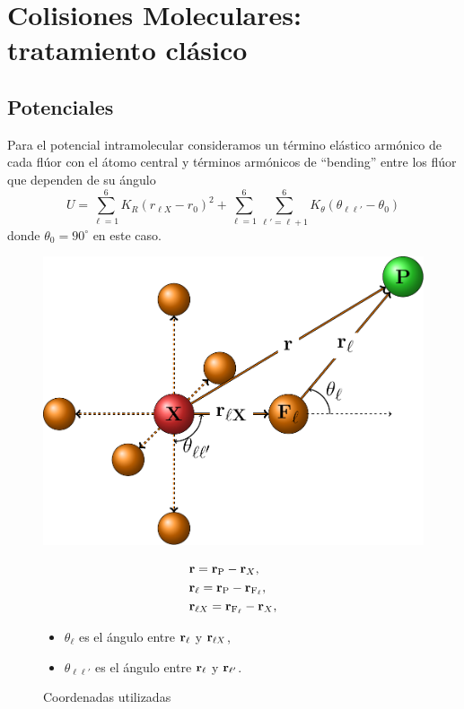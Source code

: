\chapter{Colisiones Moleculares: tratamiento cl\'{a}sico}
\label{C:colis-molec}


\section{Potenciales}
\label{S:potenciales}

Para el potencial intramolecular consideramos un t\'{e}rmino el\'{a}stico arm\'{o}nico de cada fl\'{u}or con el \'{a}tomo central y t\'{e}rminos arm\'{o}nicos de ``bending'' entre los fl\'{u}or que dependen de su \'{a}ngulo
\begin{equation}\label{Q:pot-intra-energy}
  U = \sum_{\ell=1}^{6} K_{R} (r_{\ell X} - r_{0})^{2} + \sum_{\ell=1}^{6} \sum_{\ell'=\ell + 1}^{6} K_{\theta} (\theta_{\ell \ell'} - \theta_{0})
\end{equation}
%
donde $\theta_{0}= 90^{\circ}$  en este caso.
  \begin{figure}[htbp]
\begin{minipage}{0.5\textwidth}
  \centering \includegraphics[width=.81\linewidth]{figures/coordenadas}
    \caption{Coordenadas utilizadas}
\end{minipage}\hfill
\begin{minipage}{0.4\textwidth}
  \begin{subequations}
    \begin{align}
      &\mathbf{r}=  \mathbf{r}_{\text{{P}}} - \mathbf{r}_{X} , \\
      &\mathbf{r}_{\ell}=  \mathbf{r}_{\text{P}} - \mathbf{r}_{\text{F}_{\ell}} , \\
      &\mathbf{r}_{\ell X}= \mathbf{r}_{\text{F}_{\ell}} - \mathbf{r}_{X} ,
    \end{align}
  \end{subequations}
  \begin{itemize}
  \item $\theta_{\ell}$ es el \'{a}ngulo entre $\mathbf{r}_{\ell}$ y $\mathbf{r}_{\ell X}$,
  \item $\theta_{\ell \ell'}$ es el \'{a}ngulo entre $\mathbf{r}_{\ell}$ y $\mathbf{r}_{\ell'}$.
  \end{itemize}
\end{minipage}
\end{figure}

